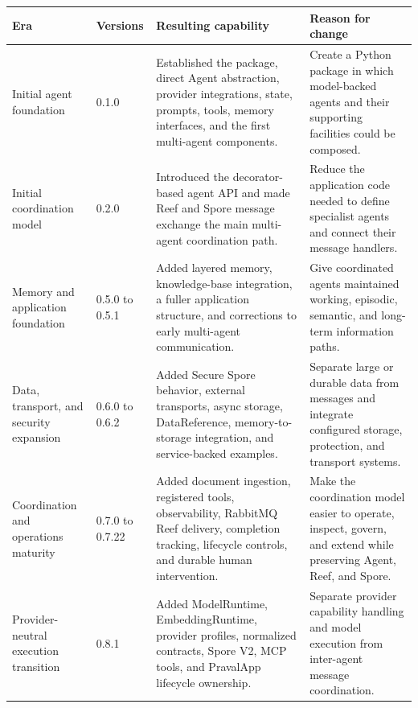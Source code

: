 \begin{tabular}{llll}
\hline
Era & Versions & Resulting capability & Reason for change \\
\hline
Initial agent foundation & 0.1.0 & Established the package, direct Agent abstraction, provider integrations, state, prompts, tools, memory interfaces, and the first multi-agent components. & Create a Python package in which model-backed agents and their supporting facilities could be composed. \\
Initial coordination model & 0.2.0 & Introduced the decorator-based agent API and made Reef and Spore message exchange the main multi-agent coordination path. & Reduce the application code needed to define specialist agents and connect their message handlers. \\
Memory and application foundation & 0.5.0 to 0.5.1 & Added layered memory, knowledge-base integration, a fuller application structure, and corrections to early multi-agent communication. & Give coordinated agents maintained working, episodic, semantic, and long-term information paths. \\
Data, transport, and security expansion & 0.6.0 to 0.6.2 & Added Secure Spore behavior, external transports, async storage, DataReference, memory-to-storage integration, and service-backed examples. & Separate large or durable data from messages and integrate configured storage, protection, and transport systems. \\
Coordination and operations maturity & 0.7.0 to 0.7.22 & Added document ingestion, registered tools, observability, RabbitMQ Reef delivery, completion tracking, lifecycle controls, and durable human intervention. & Make the coordination model easier to operate, inspect, govern, and extend while preserving Agent, Reef, and Spore. \\
Provider-neutral execution transition & 0.8.1 & Added ModelRuntime, EmbeddingRuntime, provider profiles, normalized contracts, Spore V2, MCP tools, and PravalApp lifecycle ownership. & Separate provider capability handling and model execution from inter-agent message coordination. \\
\hline
\end{tabular}
